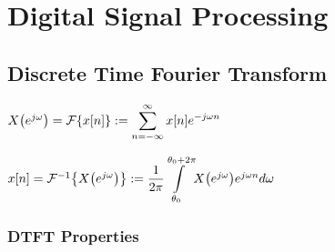 \documentclass[11pt]{article}
\begin{document}
  \pagebreak

  \section{Digital Signal Processing}

  \subsection{Discrete Time Fourier Transform}
  \begin{multicols}{2}
    \(X{\left( e^{j\omega} \right)} = \mathcal{F}{\left\{ x[n] \right\}} := \displaystyle \sum_{n = -\infty}^{\infty} x[n]e^{-j\omega n}\)

    \columnbreak

    \(x[n] = \mathcal{F}^{-1}{\left\{ X{\left( e^{j\omega} \right)} \right\}} :=
    \dfrac{1}{2\pi}\displaystyle{\int\limits_{\theta_0}^{\theta_0 + 2\pi}} \textstyle
    X{\left( e^{j\omega} \right)}e^{j\omega n} d\omega\)
  \end{multicols}

  \subsubsection{DTFT Properties}
\end{document}
